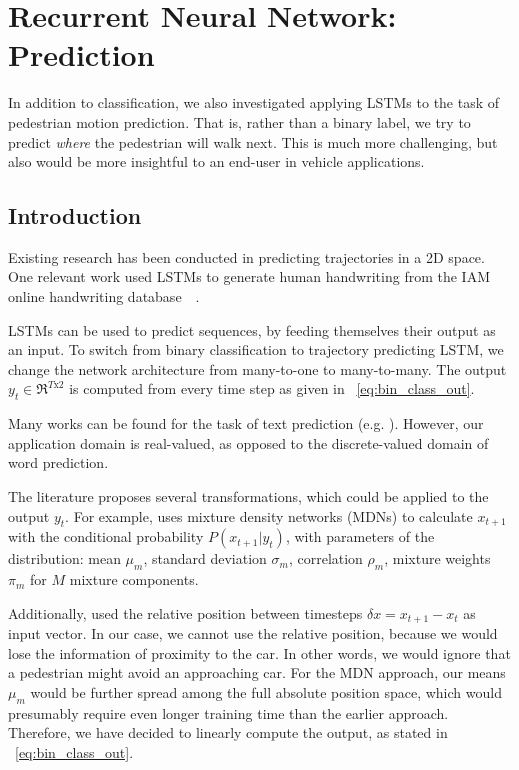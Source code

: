 \section{Recurrent Neural Network: Prediction} \label{sec:rnn_pred}

In addition to classification, we also investigated applying LSTMs to the task of pedestrian motion prediction.
That is, rather than a binary label, we try to predict \textit{where} the pedestrian will walk next.
This is much more challenging, but also would be more insightful to an end-user in vehicle applications.

\subsection{Introduction}
Existing research has been conducted in predicting trajectories in a 2D space. 
One relevant work used LSTMs to generate human handwriting from the IAM online handwriting database~\cite{DBLP:journals/corr/Graves13}~\cite{otoro}.

LSTMs can be used to predict sequences, by feeding themselves their output as an input.
To switch from binary classification to trajectory predicting LSTM, we change the network architecture from many-to-one to many-to-many.
The output $y_t \in \Re^{T\text{x}2}$ is computed from every time step as given in ~\cref{eq:bin_class_out}.

Many works can be found for the task of text prediction (e.g. \cite{ICML2011Sutskever_524}).
However, our application domain is real-valued, as opposed to the discrete-valued domain of word prediction.

The literature proposes several transformations, which could be applied to the output $y_t$.
For example, \cite{DBLP:journals/corr/Graves13} uses mixture density networks (MDNs) to calculate $x_{t+1}$ with the conditional probability $P(x_{t+1}|y_t)$, with parameters of the distribution: mean $\mu_m$, standard deviation $\sigma_m$, correlation $\rho_m$, mixture weights $\pi_m$ for $M$ mixture components.

Additionally, \cite{DBLP:journals/corr/Graves13} used the relative position between timesteps $\delta x = x_{t+1} - x_t$ as input vector.
In our case, we cannot use the relative position, because we would lose the information of proximity to the car.
In other words, we would ignore that a pedestrian might avoid an approaching car.
For the MDN approach, our means $\mu_m$ would be further spread among the full absolute position space, which would presumably require even longer training time than the earlier approach.
Therefore, we have decided to linearly compute the output, as stated in ~\cref{eq:bin_class_out}. 

